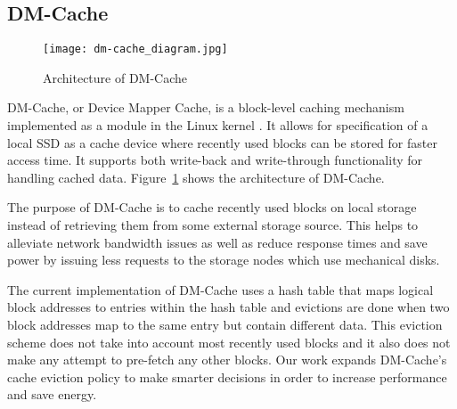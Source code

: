 \subsection{DM-Cache}

\begin{figure}
  \caption{Architecture of DM-Cache}
  \centering \texttt{[image: dm-cache\_diagram.jpg]}
  \label{fig:dm-cache}
\end{figure}

DM-Cache, or Device Mapper Cache, is a block-level caching mechanism implemented
as a module in the Linux kernel \cite{DM-Cache}. It allows for specification of
a local SSD as a cache device where recently used blocks can be stored for
faster access time. It supports both write-back and write-through functionality
for handling cached data. Figure~\ref{fig:dm-cache} shows the architecture of
DM-Cache.

The purpose of DM-Cache is to cache recently used blocks on local storage
instead of retrieving them from some external storage source. This helps to
alleviate network bandwidth issues as well as reduce response times and save
power by issuing less requests to the storage nodes which use mechanical disks.

The current implementation of DM-Cache uses a hash table that maps logical block
addresses to entries within the hash table and evictions are done when two block
addresses map to the same entry but contain different data. This eviction scheme
does not take into account most recently used blocks and it also does not make
any attempt to pre-fetch any other blocks. Our work expands DM-Cache's cache
eviction policy to make smarter decisions in order to increase performance and
save energy.
